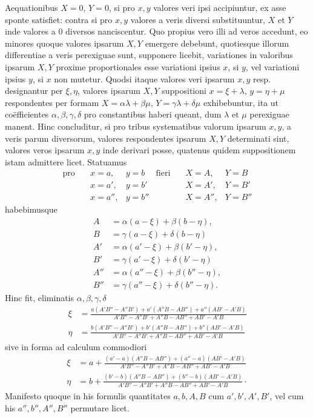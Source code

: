 Aequationibus $X=0$, $Y=0$, si pro $x,y$ valores veri ipsi accipiuntur,
ex asse sponte satisfiet: contra si pro $x,y$ valores a veris diversi substituuntur,
$X$ et $Y$ inde valores a $0$ diversos nanciscentur. Quo propius vero illi
ad veros accedunt, eo minores quoque valores ipsarum $X,Y$ emergere debebunt,
quotiesque illorum differentiae a veris perexiguae sunt, supponere licebit,
variationes in valoribus ipsarum $X,Y$ proxime proportionales esse variationi
ipsius $x$, si $y$, vel variationi ipsius $y$, si $x$ non mutetur. Quodsi itaque
valores veri ipsarum $x,y$ resp. designantur per $\xi,\eta$, valores ipsarum $X,Y$ suppositioni
$x=\xi+\lambda$, $y=\eta+\mu$ respondentes per formam $X=\alpha\lambda+\beta\mu$, $Y=\gamma\lambda+\delta\mu$ exhibebuntur, ita ut coëfficientes $\alpha,\beta,\gamma,\delta$ pro constantibus haberi
queant, dum $\lambda$ et $\mu$ perexiguae manent. Hinc concluditur, si pro tribus systematibus
valorum ipsarum $x,y$, a veris parum diversorum, valores respondentes
ipsarum $X,Y$ determinati sint, valores veros ipsarum $x,y$ inde derivari
posse, quatenus quidem suppositionem istam admittere licet. Statuamus
\[
\begin{array}{rlllll}
\text{pro}\quad & x=a, & y=b & \text{fieri}\quad & X=A, & Y=B\\
& x=a', & y=b' && X=A', & Y=B'\\
& x=a'', & y=b'' && X=A'', & Y=B''
\end{array}
\]
habebimusque
\[
\begin{aligned}
A&=\alpha(a-\xi)+\beta(b-\eta),\\
B&=\gamma(a-\xi)+\delta(b-\eta)\\
A'&=\alpha(a'-\xi)+\beta(b'-\eta),\\
B'&=\gamma(a'-\xi)+\delta(b'-\eta)\\
A''&=\alpha(a''-\xi)+\beta(b''-\eta),\\
B''&=\gamma(a''-\xi)+\delta(b''-\eta).
\end{aligned}
\]
Hinc fit, eliminatis $\alpha,\beta,\gamma,\delta$
\[
\begin{aligned}
\xi&=\frac{a(A'B''-A''B')+a'(A''B-AB'')+a''(AB'-A'B)}{A'B''-A''B'+A''B-AB''+AB'-A'B}\\[6pt]
\eta&=\frac{b(A'B''-A''B')+b'(A''B-AB'')+b''(AB'-A'B)}{A'B''-A''B'+A''B-AB''+AB'-A'B}
\end{aligned}
\]
sive in forma ad calculum commodiori
\[
\begin{aligned}
\xi&=a+\frac{(a'-a)(A''B-AB'')+(a''-a)(AB'-A'B)}{A'B''-A''B'+A''B-AB''+AB'-A'B}\\[6pt]
\eta&=b+\frac{(b'-b)(A''B-AB'')+(b''-b)(AB'-A'B)}{A'B''-A''B'+A''B-AB''+AB'-A'B}\mathpunct{\cdot}
\end{aligned}
\]
Manifesto quoque in his formulis quantitates $a,b,A,B$ cum $a',b',A',B'$, vel
cum his $a'',b'',A'',B''$ permutare licet.


